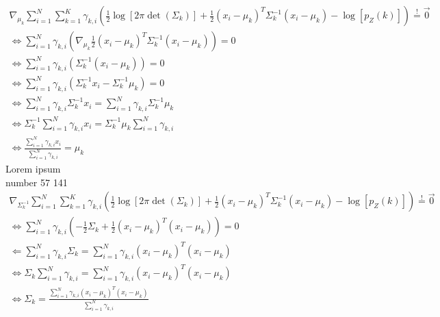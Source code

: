 \documentclass[12pt,paper=a4,twoside]{scrartcl}
\begin{document}
\begin{gather*}
\nabla_{\mu_k} \sum_{i=1}^N \sum_{k=1}^K \gamma_{k,i} \left(\frac{1}{2}\log[2\pi \det(\Sigma_k)] + \frac{1}{2} (x_i - \mu_k)^T \Sigma_k^{-1} (x_i - \mu_k) - \log[p_Z(k)]\right) \stackrel{!}{=} \vec{0}\\
\Leftrightarrow \sum_{i=1}^N \gamma_{k,i} \left( \nabla_{\mu_k} \frac{1}{2} (x_i - \mu_k)^T \Sigma_k^{-1} (x_i - \mu_k) \right) = 0\\
\Leftrightarrow \sum_{i=1}^N \gamma_{k,i} \left( \Sigma^{-1}_k (x_i - \mu_k) \right) = 0\\
\Leftrightarrow \sum_{i=1}^N \gamma_{k,i} \left( \Sigma^{-1}_k x_i - \Sigma^{-1}_k \mu_k \right) = 0\\
\Leftrightarrow \sum_{i=1}^N \gamma_{k,i} \Sigma^{-1}_k x_i = \sum_{i=1}^N  \gamma_{k,i} \Sigma^{-1}_k \mu_k\\
\Leftrightarrow \Sigma_k^{-1} \sum_{i=1}^N \gamma_{k,i} x_i = \Sigma_k^{-1} \mu_k \sum_{i=1}^N \gamma_{k,i}\\
\Leftrightarrow \frac{\sum_{i=1}^N \gamma_{k,i} x_i}{\sum_{i=1}^N \gamma_{k,i}} = \mu_k
\end{gather*}
Lorem ipsum \\
number 57 141
\begin{gather*}
\nabla_{\Sigma_k^{-1}} \sum_{i=1}^N \sum_{k=1}^K \gamma_{k,i} \left(\frac{1}{2}\log[2\pi \det(\Sigma_k)] + \frac{1}{2} (x_i - \mu_k)^T \Sigma_k^{-1} (x_i - \mu_k) - \log[p_Z(k)]\right) \stackrel{!}{=} \vec{0}\\
\Leftrightarrow\sum_{i=1}^N  \gamma_{k,i} \left(-\frac{1}{2}\Sigma_k + \frac{1}{2} (x_i - \mu_k)^T (x_i - \mu_k)\right) = 0\\
\Leftarrow\sum_{i=1}^N  \gamma_{k,i} \Sigma_k = \sum_{i=1}^N  \gamma_{k,i} (x_i - \mu_k)^{T} (x_i - \mu_k)\\
\Leftrightarrow \Sigma_k \sum_{i=1}^N  \gamma_{k,i} = \sum_{i=1}^N  \gamma_{k,i} (x_i - \mu_k)^{T} (x_i - \mu_k)\\
\Leftrightarrow \Sigma_k = \frac{\sum_{i=1}^N  \gamma_{k,i} (x_i - \mu_k)^{T} (x_i - \mu_k)}{\sum_{i=1}^N  \gamma_{k,i}}
\end{gather*}
\end{document}
